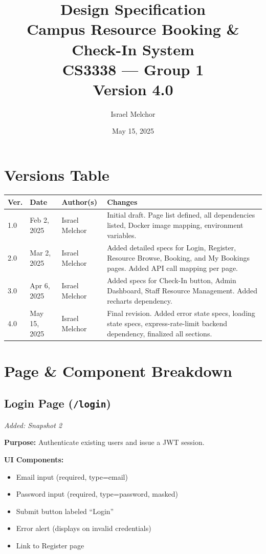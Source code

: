 \documentclass[12pt]{article}
\title{
    \vspace{2cm}
    {\Large Design Specification} \\[1em]
    {\LARGE \textbf{Campus Resource Booking \& Check-In System}} \\[2em]
    {\large CS3338 --- Group 1} \\[0.5em]
    {\normalsize Version 4.0}
    \vspace{2cm}
}
\author{Israel Melchor}
\date{May 15, 2025}
\begin{document}
\maketitle
\thispagestyle{empty}
\newpage

\tableofcontents
\newpage

\section*{Versions Table}

\begin{longtable}{|p{1.4cm}|p{2.4cm}|p{3.5cm}|p{6.5cm}|}
\hline
\textbf{Ver.} & \textbf{Date} & \textbf{Author(s)} & \textbf{Changes} \\
\hline
1.0 & Feb 2, 2025  & Israel Melchor & Initial draft. Page list defined, all dependencies listed, Docker image mapping, environment variables. \\
\hline
2.0 & Mar 2, 2025  & Israel Melchor & Added detailed specs for Login, Register, Resource Browse, Booking, and My Bookings pages. Added API call mapping per page. \\
\hline
3.0 & Apr 6, 2025  & Israel Melchor & Added specs for Check-In button, Admin Dashboard, Staff Resource Management. Added recharts dependency. \\
\hline
4.0 & May 15, 2025 & Israel Melchor & Final revision. Added error state specs, loading state specs, express-rate-limit backend dependency, finalized all sections. \\
\hline
\end{longtable}
\newpage

\section{Page \& Component Breakdown}

\subsection{Login Page (\texttt{/login})}
\textit{Added: Snapshot 2}

\textbf{Purpose:} Authenticate existing users and issue a JWT session.

\textbf{UI Components:}
\begin{itemize}
    \item Email input (required, type=email)
    \item Password input (required, type=password, masked)
    \item Submit button labeled ``Login''
    \item Error alert (displays on invalid credentials)
    \item Link to Register page
\end{itemize}
\end{document}

